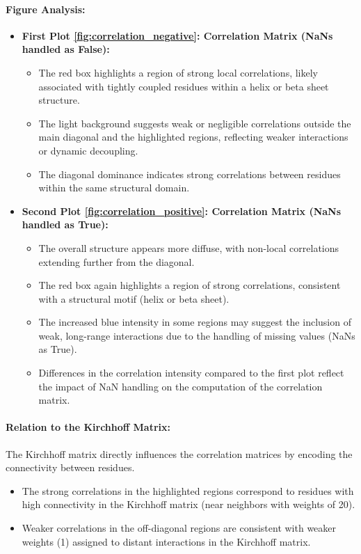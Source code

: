 \documentclass[English, Lau, oneside]{sapthesis}
\begin{document}
\paragraph{Figure Analysis:}
\begin{itemize}
    \item \textbf{First Plot \ref{fig:correlation_negative}: Correlation Matrix (NaNs handled as False):}
    \begin{itemize}
        \item The red box highlights a region of strong local correlations, likely associated with tightly coupled residues within a helix or beta sheet structure.
        \item The light background suggests weak or negligible correlations outside the main diagonal and the highlighted regions, reflecting weaker interactions or dynamic decoupling.
        \item The diagonal dominance indicates strong correlations between residues within the same structural domain.
    \end{itemize}

    \item \textbf{Second Plot \ref{fig:correlation_positive}: Correlation Matrix (NaNs handled as True):}
    \begin{itemize}
        \item The overall structure appears more diffuse, with non-local correlations extending further from the diagonal.
        \item The red box again highlights a region of strong correlations, consistent with a structural motif (helix or beta sheet).
        \item The increased blue intensity in some regions may suggest the inclusion of weak, long-range interactions due to the handling of missing values (NaNs as True).
        \item Differences in the correlation intensity compared to the first plot reflect the impact of NaN handling on the computation of the correlation matrix.
    \end{itemize}
\end{itemize}

\paragraph{Relation to the Kirchhoff Matrix:}
The Kirchhoff matrix directly influences the correlation matrices by encoding the connectivity between residues. 
\begin{itemize}
    \item The strong correlations in the highlighted regions correspond to residues with high connectivity in the Kirchhoff matrix (near neighbors with weights of 20).
    \item Weaker correlations in the off-diagonal regions are consistent with weaker weights (1) assigned to distant interactions in the Kirchhoff matrix.
\end{itemize}
\end{document}
